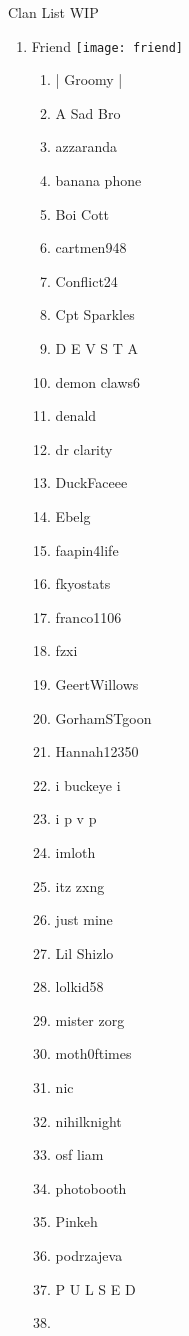 \documentclass{article}
\begin{document}
Clan List WIP
\begin{enumerate}[I]
  \item 
    Friend \texttt{[image: friend]}
    \begin{enumerate}[I]
      \item
	| Groomy |
      \item
	A Sad Bro
      \item
	azzaranda
      \item
	banana phone
      \item
	Boi Cott
      \item
	cartmen948
      \item
	Conflict24
      \item
	Cpt Sparkles
      \item
	D E V S T A
      \item
	demon claws6
      \item
	denald
      \item
	dr clarity
      \item
	DuckFaceee
      \item
	Ebelg
      \item
	faapin4life
      \item
	fkyostats
      \item
	franco1106
      \item
	fzxi
      \item
	GeertWillows
      \item
	GorhamSTgoon
      \item
	Hannah12350
      \item
	i buckeye i
      \item
	i p v p
      \item
	imloth
      \item
	itz zxng
      \item
	just mine
      \item
	Lil Shizlo
      \item
	lolkid58
      \item
	mister zorg
      \item
	moth0ftimes
      \item
	nic
      \item
	nihilknight
      \item
	osf liam
      \item
	photobooth
      \item
	Pinkeh
      \item
	podrzajeva
      \item
	P U L S E D
      \item

\end{enumerate}
\end{enumerate}
\end{document}
